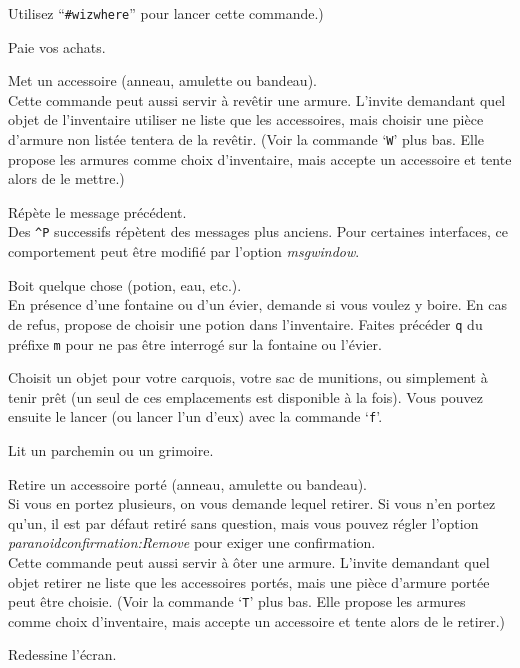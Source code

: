 \documentclass[titlepage]{article}
\begin{document}
\begin{description}[font=\mdseries\ttfamily]
Utilisez ``\texttt{\#wizwhere}'' pour lancer cette commande.)
\item[p]
Paie vos achats.
\item[P]
Met un accessoire (anneau, amulette ou bandeau).\\
Cette commande peut aussi servir à revêtir une armure.  L'invite
demandant quel objet de l'inventaire utiliser ne liste que les accessoires, mais choisir
une pièce d'armure non listée tentera de la revêtir.
(Voir la commande `\texttt{W}' plus bas.  Elle propose les armures comme choix
d'inventaire, mais accepte un accessoire et tente alors de le mettre.)
\item[\textasciicircum P]
Répète le message précédent.\\
Des \texttt{\textasciicircum P} successifs répètent des messages plus anciens.
Pour certaines interfaces, ce comportement peut être modifié par l'option
\textit{msg\textunderscore window}.
\item[q]
Boit quelque chose (potion, eau, etc.).\\
En présence d'une fontaine ou d'un évier, demande si vous voulez y
boire.
En cas de refus, propose de choisir une potion dans
l'inventaire.
Faites précéder \texttt{q} du préfixe \texttt{m} pour ne pas être interrogé
sur la fontaine ou l'évier.
\item[Q]
Choisit un objet pour votre carquois, votre sac de munitions, ou simplement
à tenir prêt (un seul de ces emplacements est disponible à la fois).  Vous pouvez ensuite
le lancer (ou lancer l'un d'eux) avec la commande `\texttt{f}'.
\item[r]
Lit un parchemin ou un grimoire.
\item[R]
Retire un accessoire porté (anneau, amulette ou bandeau).\\
Si vous en portez plusieurs, on vous demande lequel
retirer.  Si vous n'en portez qu'un, il est par défaut retiré
sans question, mais vous pouvez régler l'option
\textit{paranoid\textunderscore confirmation:Remove}
pour exiger une confirmation.\\
Cette commande peut aussi servir à ôter une armure.  L'invite demandant quel
objet retirer ne liste que les accessoires portés, mais une pièce
d'armure portée peut être choisie.
(Voir la commande `\texttt{T}' plus bas.  Elle propose les armures comme choix
d'inventaire, mais accepte un accessoire et tente alors de le retirer.)
\item[\textasciicircum R]
Redessine l'écran.

\end{description}
\end{document}
